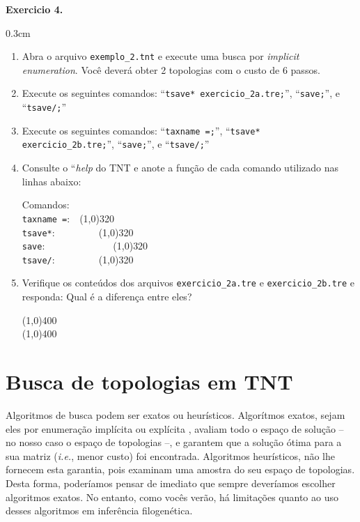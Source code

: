 \begin{refsection}
\begin{blackBlock}{\textbf{Exercicio 4.}}
\begin {myindentpar}{0.3cm}
\begin{enumerate}[\itshape i.]
	\item{Abra o arquivo \texttt{exemplo\_2.tnt} e execute uma busca por \textit{implicit enumeration}. Você deverá obter 2 topologias com o custo de 6 passos.}
	\item{Execute os seguintes comandos: ``\texttt{tsave* exercicio\_2a.tre;}'', ``\texttt{save;}'', e ``\texttt{tsave/;}''}
	\item{Execute os seguintes comandos: ``\texttt{taxname =;}'', ``\texttt{tsave* exercicio\_2b.tre;}'', ``\texttt{save;}'', e ``\texttt{tsave/;}''}
	\item{Consulte o ``\textit{help} do TNT e anote a função de cada comando utilizado nas linhas abaixo:}

Comandos:\\
\texttt{taxname =}:~~\line(1,0){320}\\
\texttt{tsave*}:~~~~~~~~~\line(1,0){320}\\
\texttt{save}:~~~~~~~~~~~~~~\line(1,0){320}\\
\texttt{tsave/}:~~~~~~~~~\line(1,0){320}\\
	\item{Verifique os conteúdos dos arquivos \texttt{exercicio\_2a.tre} e \texttt{exercicio\_2b.tre} e responda: Qual é a diferença entre eles?}
\begin{center}
\line(1,0){400}\\
\line(1,0){400}\\
\end{center}
\end{enumerate}
\end{myindentpar}

\end{blackBlock}


\section{Busca de topologias em TNT}\label{tut4:search}

Algoritmos de busca podem ser exatos ou heurísticos. Algorítmos exatos, sejam eles por enumeração implícita ou explícita \parencite{Land_and_Doig_1960, Hendy_and_Penny_1982}, avaliam todo o espaço de solução -- no nosso caso o espaço de topologias --, e garantem que a solução ótima para a sua matriz (\textit{i.e.}, menor custo) foi encontrada. Algoritmos heurísticos, não lhe fornecem esta garantia, pois examinam uma amostra do seu espaço de topologias. Desta forma, poderíamos pensar de imediato que sempre deveríamos escolher algoritmos exatos. No entanto, como vocês verão, há limitações quanto ao uso desses algoritmos em inferência filogenética.


\end{refsection}

